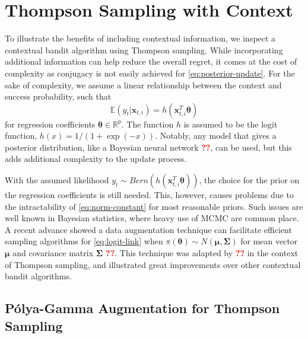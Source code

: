 \documentclass[12pt]{article}
\newcommand{\bred}[1]{\textbf{\textcolor{red}{#1}}}
\begin{document}
\section{Thompson Sampling with Context}

To illustrate the benefits of including contextual information, we inspect a 
contextual bandit algorithm using Thompson sampling.
While incorporating additional information can help reduce the overall regret, 
it comes at the cost of complexity as conjugacy is not easily achieved for 
\eqref{eq:posterior-update}.
For the sake of complexity, we assume a linear relationship between the context 
and success probability, such that
\begin{equation}
\mathbb{E}(y_t \vert \bm{x}_{t,i}) = h(\bm{x}_{t,i}^T \bm{\theta})
\label{eq:logit-link}
\end{equation}
for regression coefficients $\bm{\theta} \in \mathbb{R}^p$. 
The function $h$ is assumed to be the logit function, 
$h(x) = 1 / (1 + \exp(-x))$.
Notably, any model that gives a posterior distribution, like a Bayesian neural network 
\bred{??}, can be used, but this adds additional complexity to the update process.

With the assumed likelihood $y_t \sim Bern(h(\bm{x}_{t,i}^T \bm{\theta}))$, the
choice for the prior on the regression coefficients is still needed.
This, however, causes problems due to the intractability of \eqref{eq:norm-constant}
for most reasonable priors.
Such issues are well known in Bayesian statistics, where heavy use of MCMC are 
common place.
A recent advance showed a data augmentation technique can facilitate efficient
sampling algorithms for \eqref{eq:logit-link} when 
$\pi(\bm{\theta}) \sim N(\bm{\mu}, \bm{\Sigma})$ 
for mean vector $\bm{\mu}$ and covariance matrix $\bm{\Sigma}$ \bred{??}.
This technique was adapted by \bred{??} in the context of Thompson sampling, 
and illustrated great improvements over other contextual bandit algorithms.

\subsection{P\'olya-Gamma Augmentation for Thompson Sampling}
\end{document}
